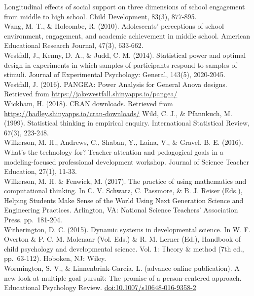 \documentclass[]{book}
\theoremstyle{definition}
\theoremstyle{definition}
\theoremstyle{definition}
\theoremstyle{remark}
\begin{document}
Longitudinal effects of social support on three dimensions of school
engagement from middle to high school. Child Development, 83(3),
877-895.\\
Wang, M. T., \& Holcombe, R. (2010). Adolescents' perceptions of school
environment, engagement, and academic achievement in middle school.
American Educational Research Journal, 47(3), 633-662.\\
Westfall, J., Kenny, D. A., \& Judd, C. M. (2014). Statistical power and
optimal design in experiments in which samples of participants respond
to samples of stimuli. Journal of Experimental Psychology: General,
143(5), 2020-2045.\\
Westfall, J. (2016). PANGEA: Power Analysis for General Anova designs.
Retrieved from \url{https://jakewestfall.shinyapps.io/pangea/}\\
Wickham, H. (2018). CRAN downloads. Retrieved from
\url{https://hadley.shinyapps.io/cran-downloads/} Wild, C. J., \&
Pfannkuch, M. (1999). Statistical thinking in empirical enquiry.
International Statistical Review, 67(3), 223-248.\\
Wilkerson, M. H., Andrews, C., Shaban, Y., Laina, V., \& Gravel, B. E.
(2016). What's the technology for? Teacher attention and pedagogical
goals in a modeling-focused professional development workshop. Journal
of Science Teacher Education, 27(1), 11-33.\\
Wilkerson, M. H. \& Fenwick, M. (2017). The practice of using
mathematics and computational thinking. In C. V. Schwarz, C. Passmore,
\& B. J. Reiser (Eds.), Helping Students Make Sense of the World Using
Next Generation Science and Engineering Practices. Arlington, VA:
National Science Teachers' Association Press. pp.~181-204.\\
Witherington, D. C. (2015). Dynamic systems in developmental science. In
W. F. Overton \& P. C. M. Molenaar (Vol. Eds.) \& R. M. Lerner (Ed.),
Handbook of child psychology and developmental science. Vol. 1: Theory
\& method (7th ed., pp.~63-112). Hoboken, NJ: Wiley.\\
Wormington, S. V., \& Linnenbrink-Garcia, L. (advance online
publication). A new look at multiple goal pursuit: The promise of a
person-centered approach. Educational Psychology Review.
\url{doi:10.1007/s10648-016-9358-2}


\end{document}
